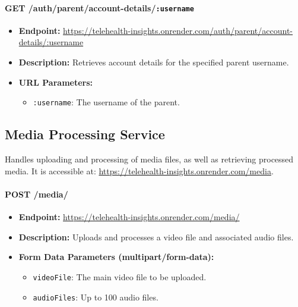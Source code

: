 \documentclass{article}
\begin{document}
\paragraph{GET /auth/parent/account-details/\texttt{:username}}
\begin{itemize}
    \item \textbf{Endpoint:} 
        \url{https://telehealth-insights.onrender.com/auth/parent/account-details/:username}
    \item \textbf{Description:} Retrieves account details for the specified 
          parent username.
    \item \textbf{URL Parameters:}
    \begin{itemize}
        \item \texttt{:username}: The username of the parent.
    \end{itemize}
\end{itemize}
  
  \subsection{Media Processing Service}
  Handles uploading and processing of media files, as well as retrieving processed media. 
  It is accessible at: 
  \url{https://telehealth-insights.onrender.com/media}.
  
  \paragraph{POST /media/}
  \begin{itemize}
      \item \textbf{Endpoint:} 
          \url{https://telehealth-insights.onrender.com/media/}
      \item \textbf{Description:} Uploads and processes a video file and 
            associated audio files.
      \item \textbf{Form Data Parameters (multipart/form-data):}
      \begin{itemize}
          \item \texttt{videoFile}: The main video file to be uploaded.
          \item \texttt{audioFiles}: Up to 100 audio files.
      \end{itemize}
  \end{itemize}
  
\end{document}
